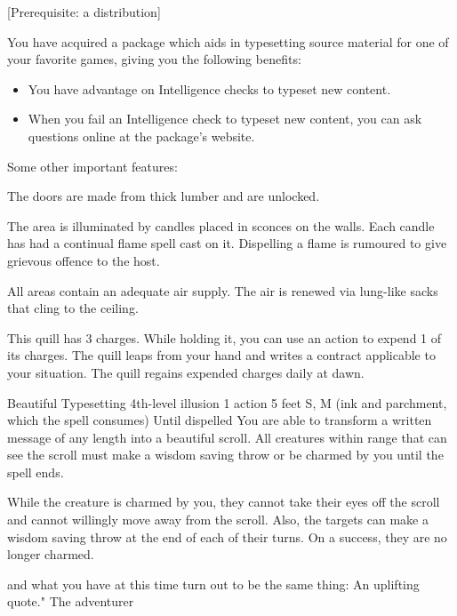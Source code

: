 \documentclass[10pt,twoside,twocolumn,openany,bg=full,notitlepage,nodeprecatedcode]{dndbook}
\begin{document}
[Prerequisite: a distribution]
{You have acquired a package which aids in typesetting source material for one of your favorite games, giving you the
following benefits:
\begin{itemize}
\item You have advantage on Intelligence checks to typeset new content.
\item When you fail an Intelligence check to typeset new content, you can ask questions online at the package’s website.
\end{itemize}
Some other important features:
\begin{description}[nosep, after = { \vspace{4pt plus 1pt minus 1pt} }]
\item[Doors:] The doors are made from thick lumber and are unlocked.
\item[Light:] The area is illuminated by candles placed in sconces on the walls. Each candle has had a continual flame spell cast on it. Dispelling a flame is rumoured to give grievous offence to the host.
\item[Ventilation:] All areas contain an adequate air supply. The air is renewed via lung-like sacks that cling to the ceiling.
\end{description}}

This quill has 3 charges. While holding it, you can use an action to expend 1 of its charges. The quill leaps from your
hand and writes a contract applicable to your situation.
The quill regains  expended charges daily at dawn.

\DndSpellHeader%
{Beautiful Typesetting}
{4th-level illusion}
{1 action}
{5 feet}
{S, M (ink and parchment, which the spell consumes)}
{Until dispelled}
You are able to transform a written message of any length into a beautiful
scroll. All creatures within range that can see the scroll must make a wisdom
saving throw or be charmed by you until the spell ends.

While the creature is charmed by you, they cannot take their eyes off the
scroll and cannot willingly move away from the scroll. Also, the targets can
make a wisdom saving throw at the end of each of their turns. On a success,
they are no longer charmed.

{and what you have at this time turn out to be the same thing: An uplifting quote."}
{The adventurer}
\end{document}
